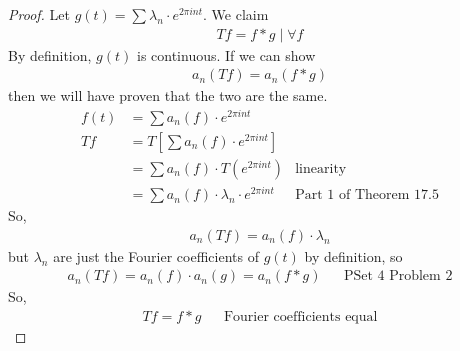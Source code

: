 \begin{proof}
    Let $g(t) = \sum \lambda_n \cdot e^{2\pi in t}$. We claim
    \begin{align}
        Tf = f*g \mid \forall f
    \end{align}
    By definition, $g(t)$ is continuous. If we can show
    \begin{align}
        a_n(Tf) = a_n(f * g)
    \end{align}
    then we will have proven that the two are the same.
    \begin{align}
        f(t) &= \sum a_n(f) \cdot e^{2\pi in t}\\
        Tf &= T\left[ \sum a_n(f) \cdot e^{2\pi in t} \right]\\
        &= \sum a_n(f) \cdot T(e^{2\pi in t}) & \text{linearity}\\
        &= \sum a_n(f) \cdot \lambda_n \cdot e^{2\pi in t} & \text{Part 1 of Theorem 17.5}
    \end{align}
    So,
    \begin{align}
        a_n(Tf) = a_n(f) \cdot \lambda_n
    \end{align}
    but $\lambda_n$ are just the Fourier coefficients of $g(t)$ by definition, so
    \begin{align}
        a_n(Tf) = a_n(f) \cdot a_n(g) = a_n(f*g) && \text{PSet 4 Problem 2}
    \end{align}
    So,
    \begin{align}
        Tf = f * g && \text{Fourier coefficients equal}
    \end{align}
\end{proof}